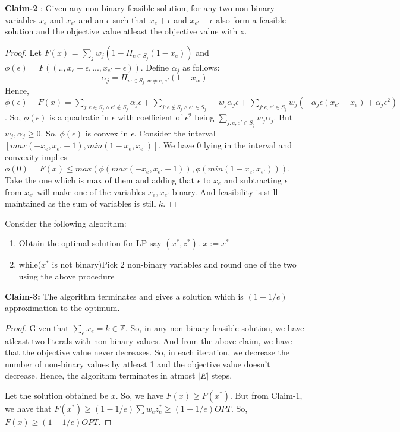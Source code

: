 \documentclass{article}
\newcommand{\size}[1]{|#1|}
\begin{document}
\noindent
\textbf{Claim-2} : Given any non-binary feasible solution, for any two non-binary variables $x_e$ and $x_{e'}$ and an $\epsilon$ such that $x_e + \epsilon$ and $x_{e'} - \epsilon$ also form a feasible solution and the objective value atleast the objective value with x.
\begin{proof}
Let $F(x)$ = $\sum_{j}w_j(1- \Pi_{e \in S_j}(1-x_{e}))$ and $\phi(\epsilon) = F((..,x_e+\epsilon,...,x_{e'}-\epsilon))$. Define $\alpha_j$ as follows:
\begin{equation}
    \alpha_j = \Pi_{w \in S_j : w \ne e,e'}(1 - x_w)
\end{equation}
Hence, $\phi(\epsilon) - F(x) = \sum_{j : e \in S_j \land e' \notin S_j}\alpha_j\epsilon + \sum_{j : e \notin S_j \land e' \in S_j} -w_j\alpha_j\epsilon + \sum_{j : e,e' \in S_j} w_j(-\alpha_j\epsilon(x_{e'} - x_e) + \alpha_j\epsilon^2)$. So, $\phi(\epsilon)$ is a quadratic in $\epsilon$ with coefficient of $\epsilon^2$ being $\sum_{j : e,e' \in S_j}w_j\alpha_j$. But $w_j,\alpha_j \geq 0$. So, $\phi(\epsilon)$ is convex in $\epsilon$. Consider the interval $[max(-x_e, x_{e'} -1), min(1 - x_e, x_{e'})]$. We have $0$ lying in the interval and convexity implies $\phi(0) = F(x) \leq max(\phi(max(-x_e, x_{e'} -1)),\phi(min(1 - x_e, x_{e'})))$. Take the one which is max of them and adding that $\epsilon$ to $x_e$ and subtracting $\epsilon$ from $x_{e'}$ will make one of the variables $x_e, x_{e'}$ binary. And feasibility is still maintained as the sum of variables is still $k$.
\end{proof}
Consider the following algorithm:
\begin{enumerate}
    \item Obtain the optimal solution for LP say $(x^*,z^*)$. $x := x^*$
    \item while($x^*$ is not binary){Pick 2 non-binary variables and round one of the two using the above procedure}
\end{enumerate}
\textbf{Claim-3:} The algorithm terminates and gives a solution which is $(1-1/e)$ approximation to the optimum.
\begin{proof}
Given that $\sum_{e}x_e = k \in \mathbb{Z}$. So, in any non-binary feasible solution, we have atleast two literals with non-binary values. And from the above claim, we have that the objective value never decreases.  So, in each iteration, we decrease the number of non-binary values by atleast 1 and the objective value doesn't decrease. Hence, the algorithm terminates in atmost $\size{E}$ steps.

Let the solution obtained be $x$. So, we have $F(x) \geq F(x^*)$. But from Claim-1, we have that $F(x^*) \geq (1-1/e)\sum w_ez_e^* \geq (1-1/e)OPT$. So, $F(x) \geq (1-1/e)OPT$.\end{proof}
\end{document}
